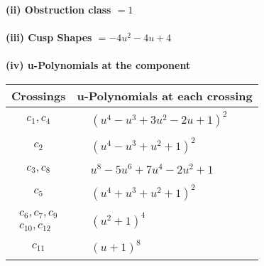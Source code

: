 \documentclass[1p]{elsarticle_modified}
\theoremstyle{definition}
\begin{document}
\flushleft \textbf{(ii) Obstruction class $= 1$}\\~\\
\flushleft \textbf{(iii) Cusp Shapes $= -4 u^2-4 u+4$}\\~\\
\newpage\renewcommand{\arraystretch}{1}
\flushleft \textbf{(iv) u-Polynomials at the component}\newline \\
\begin{tabular}{m{50pt}|m{274pt}}
Crossings & \hspace{64pt}u-Polynomials at each crossing \\
\hline $$\begin{aligned}c_{1},c_{4}\end{aligned}$$&$\begin{aligned}
&(u^4- u^3+3 u^2-2 u+1)^2
\end{aligned}$\\
\hline $$\begin{aligned}c_{2}\end{aligned}$$&$\begin{aligned}
&(u^4- u^3+u^2+1)^2
\end{aligned}$\\
\hline $$\begin{aligned}c_{3},c_{8}\end{aligned}$$&$\begin{aligned}
&u^8-5 u^6+7 u^4-2 u^2+1
\end{aligned}$\\
\hline $$\begin{aligned}c_{5}\end{aligned}$$&$\begin{aligned}
&(u^4+u^3+u^2+1)^2
\end{aligned}$\\
\hline $$\begin{aligned}c_{6},c_{7},c_{9}\\c_{10},c_{12}\end{aligned}$$&$\begin{aligned}
&(u^2+1)^4
\end{aligned}$\\
\hline $$\begin{aligned}c_{11}\end{aligned}$$&$\begin{aligned}
&(u+1)^8
\end{aligned}$\\
\hline
\end{tabular}\\~\\
\end{document}
